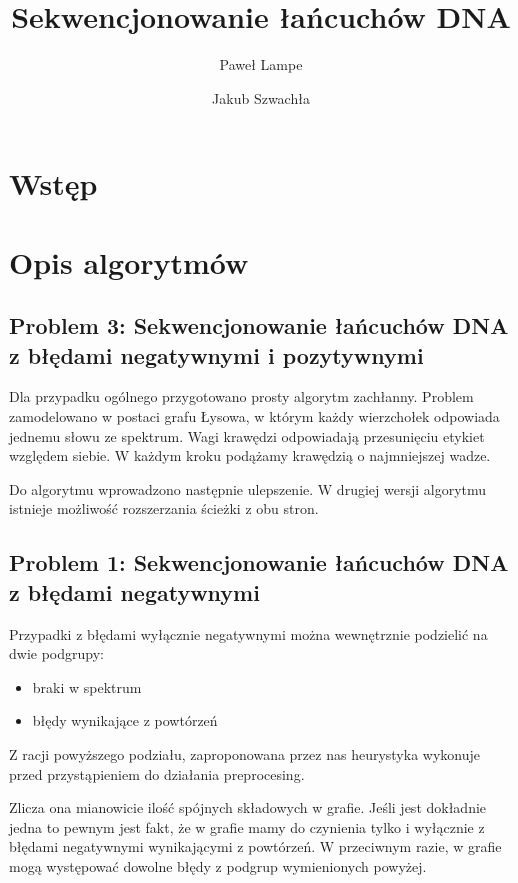 \documentclass[a4paper]{article}
\title{\textbf{Sekwencjonowanie łańcuchów DNA}}
\date{}
\author{Paweł Lampe \and Jakub Szwachła}
\begin{document}
\maketitle

\section{Wstęp}

\section{Opis algorytmów}

\subsection{Problem 3: Sekwencjonowanie łańcuchów DNA z błędami negatywnymi i pozytywnymi}      %

Dla przypadku ogólnego przygotowano prosty algorytm zachłanny. Problem
zamodelowano w postaci grafu Łysowa, w którym każdy wierzchołek
odpowiada jednemu słowu ze spektrum. Wagi krawędzi odpowiadają
przesunięciu etykiet względem siebie. W każdym kroku podążamy krawędzią
o najmniejszej wadze.

Do algorytmu wprowadzono następnie ulepszenie. W drugiej wersji
algorytmu istnieje możliwość rozszerzania ścieżki z obu stron.


\subsection{Problem 1: Sekwencjonowanie łańcuchów DNA z błędami negatywnymi}
Przypadki z błędami wyłącznie negatywnymi można wewnętrznie podzielić na dwie podgrupy:
\begin{itemize}
\item braki w spektrum
\item błędy wynikające z powtórzeń
\end{itemize}
Z racji powyższego podziału, zaproponowana przez nas heurystyka wykonuje przed przystąpieniem do działania preprocesing.

Zlicza ona mianowicie ilość spójnych składowych w grafie. Jeśli jest dokładnie jedna to pewnym jest fakt, że w grafie
mamy do czynienia tylko i wyłącznie z błędami negatywnymi wynikającymi z powtórzeń. W przeciwnym razie, w grafie
mogą występować dowolne błędy z podgrup wymienionych powyżej.
\end{document}
